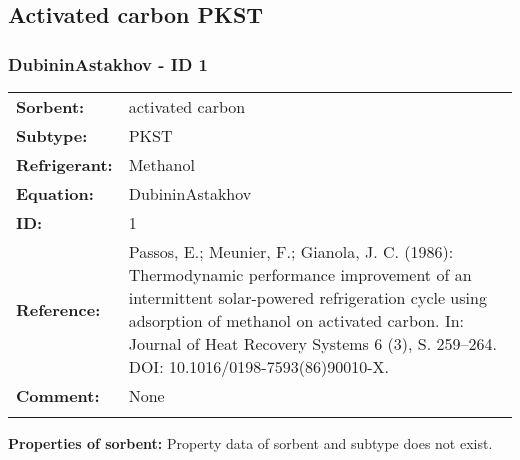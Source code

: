 \subsection{Activated carbon PKST}
%
\subsubsection{DubininAstakhov - ID 1}
%
\begin{tabular}[l]{|lp{11.5cm}|}
\hline
\addlinespace

\textbf{Sorbent:} & activated carbon \\
\textbf{Subtype:} & PKST \\
\textbf{Refrigerant:} & Methanol \\
\textbf{Equation:} & DubininAstakhov \\
\textbf{ID:} & 1 \\
\textbf{Reference:} & Passos, E.; Meunier, F.; Gianola, J. C. (1986): Thermodynamic performance improvement of an intermittent solar-powered refrigeration cycle using adsorption of methanol on activated carbon. In: Journal of Heat Recovery Systems 6 (3), S. 259–264. DOI: 10.1016/0198-7593(86)90010-X. \\
\textbf{Comment:} & None \\

\addlinespace
\hline
\end{tabular}
\newline

\textbf{Properties of sorbent:}
\newline
%
Property data of sorbent and subtype does not exist.

